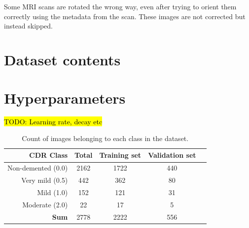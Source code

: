 \documentclass{kththesis}
\begin{document}
Some MRI scans are rotated the wrong way, even after trying to orient them correctly using the metadata from the scan. These images are not corrected but instead skipped.

\section{Dataset contents}

\section{Hyperparameters}
\hl{TODO: Learning rate, decay etc}

\begin{table}[h]
  \begin{center}
    \caption{Count of images belonging to each class in the dataset.\label{tab:dataset_contents}}
    \begin{tabular}{r|cccc}
      \textbf{CDR Class} & \textbf{Total} & \textbf{Training set} & \textbf{Validation set} \\
      \toprule
      Non-demented (0.0) & 2162 & 1722 & 440 \\
      Very mild (0.5) & 442 & 362 & 80 \\
      Mild (1.0) & 152 & 121 & 31 \\
      Moderate (2.0) & 22 & 17 & 5 \\
      \bottomrule
      \textbf{Sum} & 2778 & 2222 & 556 \\
    \end{tabular}
  \end{center}
\end{table}
\end{document}
